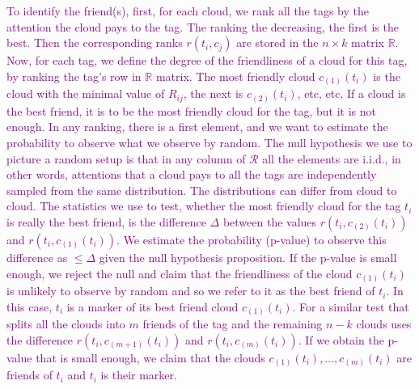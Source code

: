 \documentclass{llncs}
\begin{document}
\textcolor{purple}{
 To identify the friend(s), first, for each cloud, we rank all the tags by the attention the cloud pays to the tag. The ranking the decreasing, the first is the best. Then the corresponding ranks $r(t_i,c_j)$ are stored in the $n\times k$ matrix $\mathbb{R}$. Now, for each tag, we define the degree of the friendliness of a cloud for this tag, by ranking the tag's row in $\mathbb{R}$ matrix. The most friendly cloud $c_{(1)}(t_i)$ is the cloud with the minimal value of $R_{ij}$, the next is $c_{(2)}(t_i)$, etc, etc. 
If a cloud is the best friend, it is to be the most friendly cloud for the tag, but it is not enough. In any ranking, there is a first element, and we want to estimate the probability to observe what we observe by random. The null hypothesis we use to picture a random setup is that in any column of $\mathcal{R}$ all the elements are i.i.d., in other words, attentions that a cloud pays to all the tags are independently sampled from the same distribution. The distributions can differ from cloud to cloud. 
The statistics we use to test, whether the most friendly cloud for the tag $t_i$ is really the best friend, is the difference $\Delta$ between the values $r(t_i,c_{(2)}(t_i))$ and $r(t_i,c_{(1)}(t_i))$. We estimate the probability (p-value) to observe this difference as $\leq \Delta$ given the null hypothesis proposition. If the p-value is small enough, we reject the null and claim that the friendliness of the cloud $c_{(1)}(t_i)$ is unlikely to observe by random and so we refer to it as the best friend of $t_i$. In this case, $t_i$ is a marker of its best friend cloud $c_{(1)}(t_i)$.
For a similar test that splits all the clouds into $m$ friends of the tag and the remaining $n-k$ clouds uses the difference  $r(t_i,c_{(m+1)}(t_i))$ and $r(t_i,c_{(m)}(t_i))$. If we obtain the p-value that is small enough, we claim that the clouds $c_{(1)}(t_i), \dots, c_{(m)}(t_i)$ are friends of $t_i$ and $t_i$ is their marker.}





\end{document}
